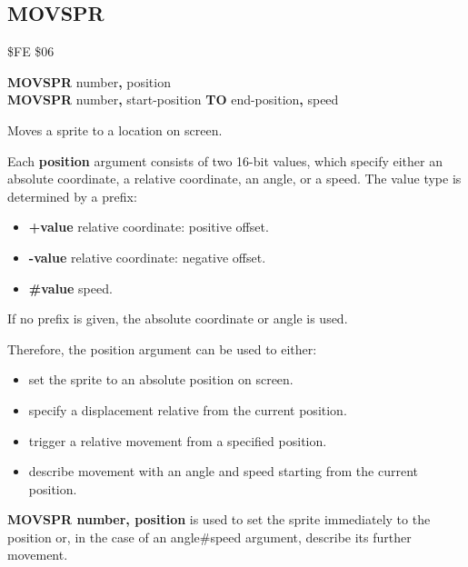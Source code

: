 \subsection{MOVSPR}
\begin{description}[leftmargin=2cm,style=nextline]
\item [Token:]    \$FE \$06

\item [Format:]   {\bf MOVSPR} number{\bf,} position \\
                  {\bf MOVSPR} number{\bf,} start-position {\bf TO} end-position{\bf,} speed

\item [Usage:]    Moves a sprite to a location on screen.

                  Each {\bf position} argument consists of two 16-bit values, which specify either an absolute coordinate, a relative coordinate, an angle, or a speed. The value type is determined by a prefix:

                  \begin{itemize}
                     \item {\bf +value} relative coordinate: positive offset.
                     \item {\bf -value} relative coordinate: negative offset.
                     \item {\bf \#value} speed.
                  \end{itemize}

                  If no prefix is given, the absolute coordinate or angle is used.

                  Therefore, the position argument can be used to either:
                  \begin{itemize}
                     \item set the sprite to an absolute position on screen.
                     \item specify a displacement relative from the current position.
                     \item trigger a relative movement from a specified position.
                     \item describe movement with an angle and speed starting from the current position.
                  \end{itemize}

                  {\bf MOVSPR number, position} is used to set the sprite immediately to the position or, in the case of an angle\#speed argument, describe its further movement.


\end{description}
